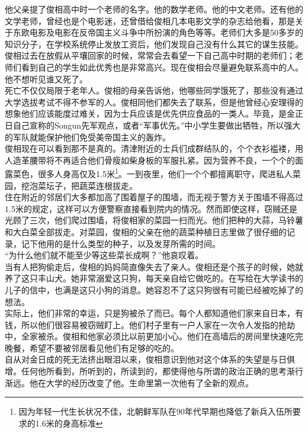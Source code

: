 他父亲提了俊相高中时一个老师的名字。他的数学老师。他的中文老师。还有他的文学老师，曾经也是个电影迷，还曾借给俊相几本电影文学的杂志给他看，那是关于东欧电影及电影在反帝国主义斗争中所扮演的角色等等。老师们大多是50多岁的知识分子，在学校系统停止发放工资后，他们发现自己没有什么其它的谋生技能。俊相过去在放假从平壤回家的时候，常常会去看望一下自己高中时期的老师们；老师们看到自己的学生如此优秀也是非常高兴。现在俊相会尽量避免联系高中的人。他不想听见谁又死了。\\

死亡不仅仅局限于老年人。俊相的母亲告诉他，他哪些同学饿死了，那些没有通过大学选拔考试不得不参军的人。俊相同他们都失去了联系，但是他曾经心安理得的想象他们应该能度过难关，因为士兵应该是优先供应食品的一类人。毕竟，是金正日自己宣称的Songun先军观点，或者“军事优先。”中小学生要做出牺牲，所以强大的军队就能保护他们免受美帝国主义的轰炸。\\

俊相现在可以看到那不是真的。清津附近的士兵们成群结队的，个个衣衫褴褛，用人造革腰带将不再适合他们骨瘦如柴身板的军服扎紧。因为营养不良，一个个的面露菜色，很多人身高仅及1.5米\footnote{因为年轻一代生长状况不佳，北朝鲜军队在90年代早期也降低了新兵入伍所要求的1.6米的身高标准}。一到夜里，他们一个个都擅离职守，爬进私人菜园，挖泡菜坛子，把蔬菜连根拔走。\\

住在附近的邻居们大多都加高了围着屋子的围墙，而无视于警方关于围墙不得高过1.5米的规定，这样可以方便警察直接看到院内的情况。然而即使这样，窃贼还是光顾了三次，他们爬过围墙，将俊相家的菜园一扫而光。他们把种的大蒜，马铃薯和大白菜全部拔走。对菜园，俊相的父亲在他的蔬菜种植日志里做了很仔细的记录，记下他用的是什么类型的种子，以及发芽所需的时间。\\

“为什么他们就不能至少等这些菜长成啊？”他哀叹着。\\

当有人把狗偷走后，俊相的妈妈简直像失去了亲人。俊相还是个孩子的时候，她就养了这只丰山犬。她非常溺爱这只狗，每天亲自给它做吃的。在写给在大学读书的儿子的信中，也满是这只小狗的消息。她容忍不了这只狗很有可能已经被吃掉了的想法。\\

实际上，他们非常的幸运，只是狗被杀了而已。每个人都知道他们家来自日本，有钱，所以他们很容易被窃贼盯上。他们村子里有一户人家在一次令人发指的抢劫中，全家被杀。俊相和他家必须比以前更加小心。他们在高墙后的房间里快速吃完晚餐，希望不要被邻居看见他们有足够的吃的。\\

自从对金日成的死无法挤出眼泪以来，俊相意识到他对这个体系的失望是与日俱增。任何他所看到，所听到的，所读到的，都使得他与所谓的政治正确的思考渐行渐远。他在大学的经历改变了他。生命里第一次他有了全新的观点。\\

